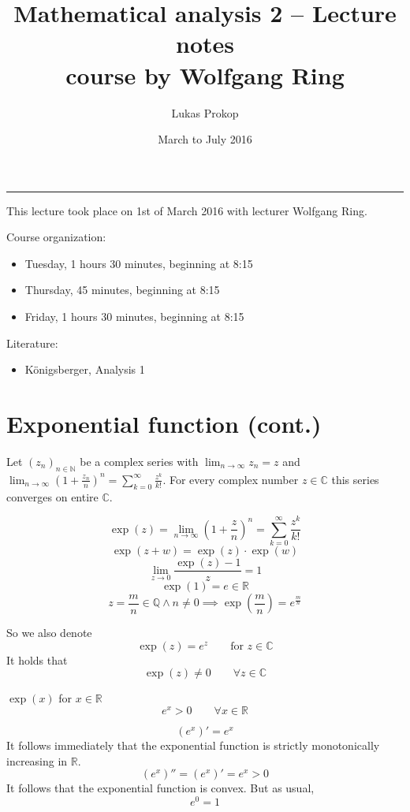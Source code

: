 \documentclass[a4paper,landscape,twocolumn]{article}
\title{
  Mathematical analysis 2 -- Lecture notes \\
  \small{course by Wolfgang Ring}
}
\author{Lukas Prokop}
\date{March to July 2016}
\theoremstyle{definition}
\newcommand\meta[3]{\hrule{} This #1 took place on #2 with lecturer #3.\par}
\begin{document}
\maketitle
\tableofcontents

\clearpage
\meta{lecture}{1st of March 2016}{Wolfgang Ring}

Course organization:
\begin{itemize}
  \item Tuesday, 1 hours 30 minutes, beginning at 8:15
  \item Thursday, 45 minutes, beginning at 8:15
  \item Friday, 1 hours 30 minutes, beginning at 8:15
\end{itemize}

Literature:
\begin{itemize}
  \item Königsberger, Analysis 1
\end{itemize}

\clearpage
\section{Exponential function (cont.)}
%
Let $(z_n)_{n \in \mathbb N}$ be a complex series with $\lim_{n\to\infty} z_n = z$
and $\lim_{n\to\infty} (1 + \frac{z_n}{n})^n = \sum_{k=0}^\infty \frac{z^k}{k!}$.
For every complex number $z \in \mathbb C$ this series converges on entire $\mathbb C$.

\[ \exp(z) = \lim_{n\to\infty} \left(1 + \frac{z}n\right)^n = \sum_{k=0}^\infty \frac{z^k}{k!} \]
\[ \exp(z + w) = \exp(z) \cdot \exp(w) \]
\[ \lim_{z\to0} \frac{\exp(z) - 1}{z} = 1 \]
\[ \exp(1) = e \in \mathbb R \]
\[ z = \frac mn \in \mathbb Q \land n \neq 0 \implies \exp\left(\frac mn\right) = e^{\frac mn} \]

So we also denote
\[ \exp(z) = e^z \qquad \text{for } z \in \mathbb C \]
It holds that
\[ \exp(z) \neq 0 \qquad \forall z \in \mathbb C \]

$\exp(x)$ for $x \in \mathbb R$
\[ e^x > 0 \qquad \forall x \in \mathbb R \]

\[ (e^x)' = e^x \]
It follows immediately that the exponential function is strictly monotonically increasing in $\mathbb R$.
\[ (e^x)'' = (e^x)' = e^x > 0 \]
It follows that the exponential function is convex. But as usual,
\[ e^0 = 1 \]
\end{document}
